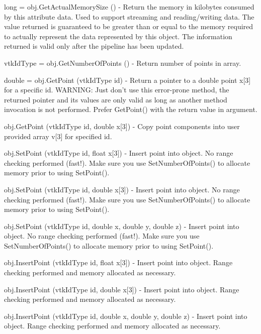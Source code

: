 \begin{DoxyItemize}
\item {\ttfamily long = obj.\-Get\-Actual\-Memory\-Size ()} -\/ Return the memory in kilobytes consumed by this attribute data. Used to support streaming and reading/writing data. The value returned is guaranteed to be greater than or equal to the memory required to actually represent the data represented by this object. The information returned is valid only after the pipeline has been updated.  
\item {\ttfamily vtk\-Id\-Type = obj.\-Get\-Number\-Of\-Points ()} -\/ Return number of points in array.  
\item {\ttfamily double = obj.\-Get\-Point (vtk\-Id\-Type id)} -\/ Return a pointer to a double point x\mbox{[}3\mbox{]} for a specific id. W\-A\-R\-N\-I\-N\-G\-: Just don't use this error-\/prone method, the returned pointer and its values are only valid as long as another method invocation is not performed. Prefer Get\-Point() with the return value in argument.  
\item {\ttfamily obj.\-Get\-Point (vtk\-Id\-Type id, double x\mbox{[}3\mbox{]})} -\/ Copy point components into user provided array v\mbox{[}3\mbox{]} for specified id.  
\item {\ttfamily obj.\-Set\-Point (vtk\-Id\-Type id, float x\mbox{[}3\mbox{]})} -\/ Insert point into object. No range checking performed (fast!). Make sure you use Set\-Number\-Of\-Points() to allocate memory prior to using Set\-Point().  
\item {\ttfamily obj.\-Set\-Point (vtk\-Id\-Type id, double x\mbox{[}3\mbox{]})} -\/ Insert point into object. No range checking performed (fast!). Make sure you use Set\-Number\-Of\-Points() to allocate memory prior to using Set\-Point().  
\item {\ttfamily obj.\-Set\-Point (vtk\-Id\-Type id, double x, double y, double z)} -\/ Insert point into object. No range checking performed (fast!). Make sure you use Set\-Number\-Of\-Points() to allocate memory prior to using Set\-Point().  
\item {\ttfamily obj.\-Insert\-Point (vtk\-Id\-Type id, float x\mbox{[}3\mbox{]})} -\/ Insert point into object. Range checking performed and memory allocated as necessary.  
\item {\ttfamily obj.\-Insert\-Point (vtk\-Id\-Type id, double x\mbox{[}3\mbox{]})} -\/ Insert point into object. Range checking performed and memory allocated as necessary.  
\item {\ttfamily obj.\-Insert\-Point (vtk\-Id\-Type id, double x, double y, double z)} -\/ Insert point into object. Range checking performed and memory allocated as necessary.  

\end{DoxyItemize}

